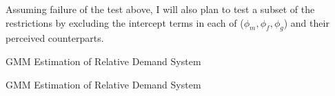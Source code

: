 \documentclass{article}
\begin{document}
Assuming failure of the test above, I will also plan to test a subset of the restrictions by excluding the intercept terms in each of ($\phi_{m},\phi_{f},\phi_{g}$) and their perceived counterparts.



\begin{table}\footnotesize\caption{\label{res1}GMM Estimation of Relative Demand System}
    \begin{center}
        
        \captionsetup{width=0.7\textwidth}
    \end{center}
\end{table}

\begin{table}\footnotesize\caption{\label{res1}GMM Estimation of Relative Demand System}
    \begin{center}
        
        \captionsetup{width=0.7\textwidth}
    \end{center}
\end{table}
\end{document}
